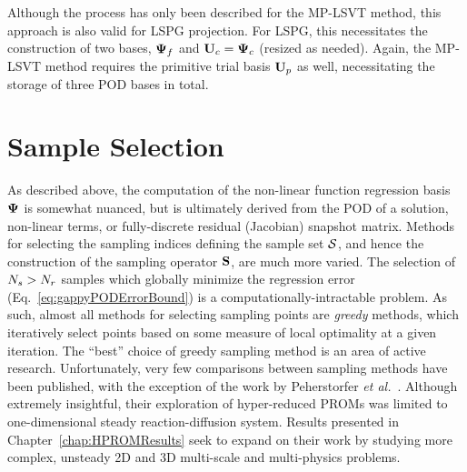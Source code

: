 Although the process has only been described for the MP-LSVT method, this approach is also valid for LSPG projection. For LSPG, this necessitates the construction of two bases, $\deimBasisRhs$ and $\consTrial = \deimBasisCons$ (resized as needed). Again, the MP-LSVT method requires the primitive trial basis $\primTrial$ as well, necessitating the storage of three POD bases in total.

\section{Sample Selection}\label{subsec:sampleSelect}

As described above, the computation of the non-linear function regression basis $\deimBasis$ is somewhat nuanced, but is ultimately derived from the POD of a solution, non-linear terms, or fully-discrete residual (Jacobian) snapshot matrix. Methods for selecting the sampling indices defining the sample set $\mathcal{S}$, and hence the construction of the sampling operator $\mathbf{S}$, are much more varied. The selection of $N_s > N_r$ samples which globally minimize the regression error (Eq.~\ref{eq:gappyPODErrorBound}) is a computationally-intractable problem. As such, almost all methods for selecting sampling points are \textit{greedy} methods, which iteratively select points based on some measure of local optimality at a given iteration. The ``best'' choice of greedy sampling method is an area of active research. Unfortunately, very few comparisons between sampling methods have been published, with the exception of the work by Peherstorfer \textit{et al.}~\cite{Peherstorfer2020}. Although extremely insightful, their exploration of hyper-reduced PROMs was limited to one-dimensional steady reaction-diffusion system. Results presented in Chapter~\ref{chap:HPROMResults} seek to expand on their work by studying more complex, unsteady 2D and 3D multi-scale and multi-physics problems.


